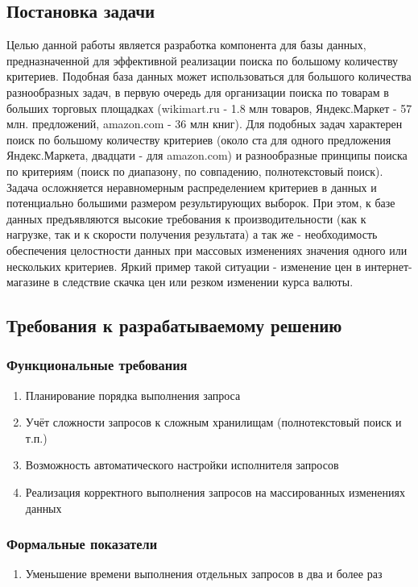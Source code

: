\documentclass{matmex-diploma}
\begin{document}
    \subsection{Постановка задачи}
        Целью данной работы является разработка компонента для базы данных, предназначенной для эффективной реализации поиска по большому количеству критериев. Подобная база данных может использоваться для большого количества разнообразных задач, в первую очередь для организации поиска по товарам в больших торговых площадках (wikimart.ru - 1.8 млн товаров, Яндекс.Маркет - 57 млн. предложений, amazon.com - 36 млн книг). Для подобных задач характерен поиск по большому количеству критериев (около ста для одного предложения Яндекс.Маркета, двадцати - для amazon.com) и разнообразные принципы поиска по критериям (поиск по диапазону, по совпадению, полнотекстовый поиск). Задача осложняется неравномерным распределением критериев в данных и потенциально большими размером результирующих выборок. При этом, к базе данных предъявляются высокие требования к производительности (как к нагрузке, так и к скорости получения результата) а так же - необходимость обеспечения целостности данных при массовых изменениях значения одного или нескольких критериев. Яркий пример такой ситуации - изменение цен в интернет-магазине в следствие скачка цен или резком изменении курса валюты.
    \subsection{Требования к разрабатываемому решению}
        
        \subsubsection{Функциональные требования}
            \begin{enumerate}
                \item Планирование порядка выполнения запроса
                \item Учёт сложности запросов к сложным хранилищам (полнотекстовый поиск и т.п.)
                \item Возможность автоматического настройки исполнителя запросов
                \item Реализация корректного выполнения запросов на массированных изменениях данных
            \end{enumerate}
        \subsubsection{Формальные показатели}
            \begin{enumerate} 
                \item Уменьшение времени выполнения отдельных запросов в два и более раз
            \end{enumerate}
\end{document}
